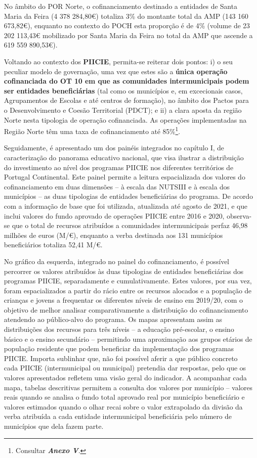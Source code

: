 \documentclass[
]{book}
\begin{document}
No âmbito do POR Norte, o cofinanciamento destinado a entidades de Santa Maria da Feira (4 378 284,80€) totaliza 3\% do montante total da AMP (143 160 673,82€), enquanto no contexto do POCH esta proporção é de 4\% (volume de 23 202 113,43€ mobilizado por Santa Maria da Feira no total da AMP que ascende a 619 559 890,53€).

Voltando ao contexto dos \textbf{PIICIE}, permita-se reiterar dois pontos: i) o seu peculiar modelo de governação, uma vez que estes são a \textbf{única operação cofinanciada do OT 10 em que as comunidades intermunicipais podem ser entidades beneficiárias} (tal como os municípios e, em excecionais casos, Agrupamentos de Escolas e até centros de formação), no âmbito dos Pactos para o Desenvolvimento e Coesão Territorial (PDCT); e ii) a clara aposta da região Norte nesta tipologia de operação cofinanciada. As operações implementadas na Região Norte têm uma taxa de cofinanciamento até 85\%\footnote{Consultar \textbf{\emph{Anexo V}}.}.

Seguidamente, é apresentado um dos painéis integrados no capítulo I, de caracterização do panorama educativo nacional, que visa ilustrar a distribuição do investimento ao nível dos programas PIICIE nos diferentes territórios de Portugal Continental. Este painel permite a leitura espacializada dos valores do cofinanciamento em duas dimensões -- à escala das NUTSIII e à escala dos municípios -- as duas tipologias de entidades beneficiárias do programa. De acordo com a informação de base que foi utilizada, atualizada até agosto de 2021, e que inclui valores do fundo aprovado de operações PIICIE entre 2016 e 2020, observa-se que o total de recursos atribuídos a comunidades intermunicipais perfaz 46,98 milhões de euros (M/€), enquanto a verba destinada aos 131 municípios beneficiários totaliza 52,41 M/€.

No gráfico da esquerda, integrado no painel do cofinanciamento, é possível percorrer os valores atribuídos às duas tipologias de entidades beneficiárias dos programas PIICIE, separadamente e cumulativamente. Estes valores, por sua vez, foram espacializados a partir do rácio entre os recursos alocados e a população de crianças e jovens a frequentar os diferentes níveis de ensino em 2019/20, com o objetivo de melhor analisar comparativamente a distribuição do cofinanciamento atendendo ao público-alvo do programa. Os mapas apresentam assim as distribuições dos recursos para três níveis -- a educação pré-escolar, o ensino básico e o ensino secundário -- permitindo uma aproximação aos grupos etários de população residente que podem beneficiar da implementação dos programas PIICIE. Importa sublinhar que, não foi possível aferir a que público concreto cada PIICIE (intermunicipal ou municipal) pretendia dar respostas, pelo que os valores apresentados refletem uma visão geral do indicador. A acompanhar cada mapa, tabelas descritivas permitem a consulta dos valores por município -- valores reais quando se analisa o fundo total aprovado real por município beneficiário e valores estimados quando o olhar recai sobre o valor extrapolado da divisão da verba atribuída a cada entidade intermunicipal beneficiária pelo número de municípios que dela fazem parte.
\end{document}
